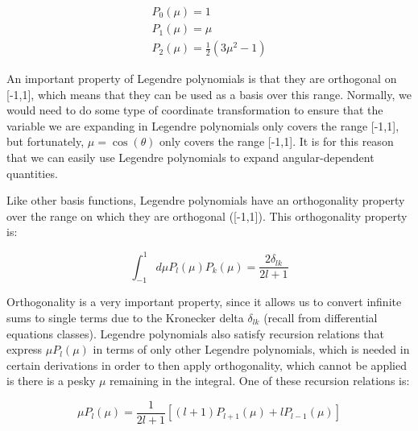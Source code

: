 \documentclass[10pt]{article}
\begin{document}
\begin{flushleft}
\begin{equation}
\label{eqn:LegendrePolynomials_P0P1P2}
\begin{aligned}
 P_0 (\mu) = 1\\
 P_1 (\mu) = \mu\\
 P_2 (\mu) = \frac{1}{2} (3\mu^2 -1)
\end{aligned}
\end{equation}

An important property of Legendre polynomials is that they are orthogonal on [-1,1], which means that they can be used as a basis over this range. Normally, we would need to do some type of coordinate transformation to ensure that the variable we are expanding in Legendre polynomials only covers the range [-1,1], but fortunately, \(\mu = \cos{(\theta)}\) only covers the range [-1,1]. It is for this reason that we can easily use Legendre polynomials to expand angular-dependent quantities. 

Like other basis functions, Legendre polynomials have an orthogonality property over the range on which they are orthogonal ([-1,1]). This orthogonality property is:

\begin{equation}
\label{eqn:LegendrePolynomialsOrthogonality}
\int_{-1}^{1} d\mu P_l (\mu) P_k (\mu) = \frac{2\delta_{lk}}{2l+1}
\end{equation}

Orthogonality is a very important property, since it allows us to convert infinite sums to single terms due to the Kronecker delta \(\delta_{lk}\) (recall from differential equations classes). Legendre polynomials also satisfy recursion relations that express \(\mu P_l(\mu)\) in terms of only other Legendre polynomials, which is needed in certain derivations in order to then apply orthogonality, which cannot be applied is there is a pesky \(\mu\) remaining in the integral. One of these recursion relations is:

\begin{equation}
\label{eqn:LegendrePolynomialRecursion1}
\mu P_l(\mu) = \frac{1}{2l+1} \left\lbrack(l+1)P_{l+1}(\mu) + l P_{l-1}(\mu)\right\rbrack
\end{equation}


\end{flushleft}
\end{document}
